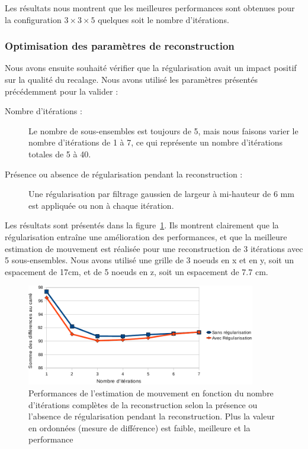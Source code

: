 Les résultats nous montrent que les meilleures performances sont obtenues pour la configuration $3 \times 3 \times 5$ quelques soit le nombre d’itérations.


\subsubsection{Optimisation des paramètres de reconstruction}

Nous avons ensuite souhaité vérifier que la régularisation avait un impact positif sur la qualité du recalage. Nous avons utilisé les paramètres présentés précédemment pour la valider :

\begin{description}
 \item[Nombre d'itérations :] Le nombre de sous-ensembles est toujours de 5, mais nous faisons varier le nombre d'itérations de 1 à 7, ce qui représente un nombre d'itérations totales de 5 à 40.
 \item[Présence ou absence de régularisation pendant la reconstruction :] Une régularisation par filtrage gaussien de largeur à mi-hauteur de 6 mm est appliquée ou non à chaque itération.
\end{description}

Les résultats sont présentés dans la figure~\ref{lab:perfsFctIterReg}. Ils montrent clairement que la régularisation entraîne une amélioration des performances, et que la meilleure estimation de mouvement est réalisée pour une reconstruction de 3 itérations avec 5 sous-ensembles. Nous avons utilisé une grille de 3 noeuds en x et en y, soit un espacement de 17cm, et de 5 noeuds en z, soit un espacement de 7.7 cm.

\begin{figure}
\centering
\includegraphics[width=10cm]{images/perfsRecalageFctIter_crop}
\caption[Performances de l'estimation de mouvement en fonction de la régularisation]{Performances de l'estimation de mouvement en fonction du nombre d'itérations complètes de la reconstruction selon la présence ou l'absence de régularisation pendant la reconstruction. Plus la valeur en ordonnées (mesure de différence) est faible, meilleure et la performance}
\label{lab:perfsFctIterReg}
\end{figure}